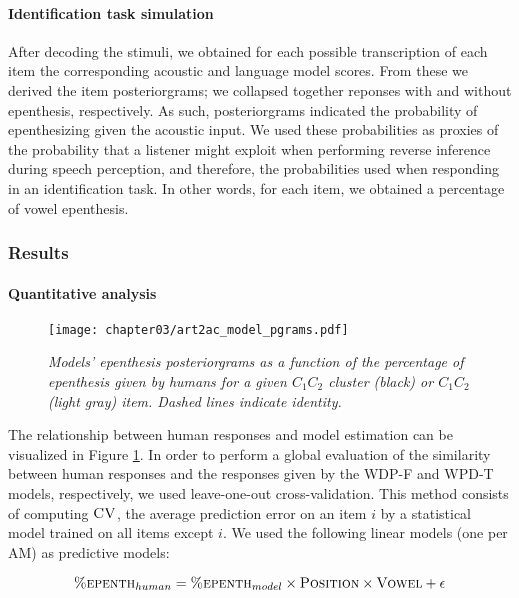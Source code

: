 {\paragraph{Identification task simulation}
After decoding the stimuli, we obtained for each possible transcription of each item the corresponding acoustic and language model scores. From these we derived the item posteriorgrams; we collapsed together reponses with and without epenthesis, respectively. As such, posteriorgrams indicated the probability of epenthesizing \textipa{[@]} given the acoustic input. We used these probabilities as proxies of the probability that a listener might exploit when performing reverse inference during speech perception, and therefore, the probabilities used when responding in an identification task. In other words, for each item, we obtained a percentage of vowel epenthesis.

\subsubsection{Results}
\paragraph{Quantitative analysis}

\begin{figure}[htb!]
    \centering
    \texttt{[image: chapter03/art2ac\_model\_pgrams.pdf]}
    \caption{\textit{Models' epenthesis posteriorgrams as a function of the percentage of epenthesis given by humans for a given $C_{1}C_{2}$ cluster (black) or $C_{1}$\textipa{[@]}$C_{2}$ (light gray) item. Dashed lines indicate identity.}}
    \label{fig:wpd-corr}
  \end{figure}

  The relationship between human responses and model estimation can be visualized in Figure \ref{fig:wpd-corr}. In order to perform a global evaluation of the similarity between human responses and the responses given by the WDP-F and WPD-T models, respectively, we used leave-one-out cross-validation. This method consists of computing $\textsc{CV}$, the average prediction error on an item $i$ by a statistical model trained on all items except $i$. We used the following linear models (one per AM) as predictive models:

  \begin{equation}
    \textsc{\%epenth}_{human} = \textsc{\%epenth}_{model} \times \textsc{Position} \times \textsc{Vowel} + \epsilon
  \end{equation}

}
